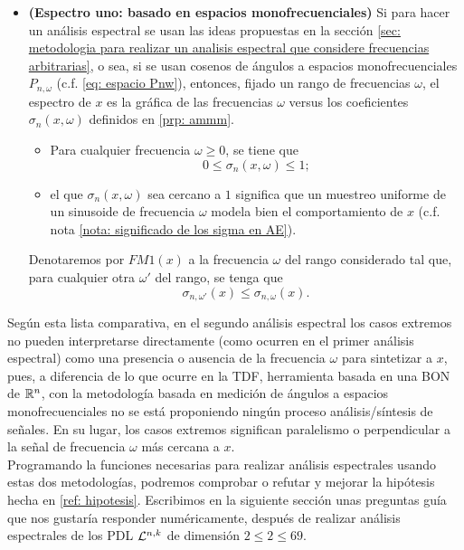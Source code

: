 \begin{itemize}
	\item \textbf{(Espectro uno: basado en espacios monofrecuenciales)} 
	Si para hacer un análisis espectral se usan
	las ideas propuestas en 
	la sección
	\ref{sec: metodologia para realizar un analisis espectral que considere frecuencias arbitrarias}, 
	o sea, si se usan cosenos de ángulos a
	espacios monofrecuenciales $P_{n, \omega}$
	(c.f. \ref{eq: espacio Pnw}),	
	entonces, fijado un rango de frecuencias 
	$\omega$,
	el espectro de $x$ es la gráfica de 
	las frecuencias $\omega$ versus	
	los coeficientes
	$\sigma_{n}(x, \omega)$ definidos en 
	\eqref{prp: ammm}.\\
	\begin{itemize}
		\item Para cualquier frecuencia $\omega \geq 0$, se tiene que
		\[
		0 \leq \sigma_{n}(x, \omega) \leq 1;
		\]
		\item 
	el que
	$\sigma_{n}(x, \omega)$ sea cercano a $1$ significa que un
	muestreo uniforme de un sinusoide de frecuencia $\omega$
	modela bien el comportamiento de $x$ (c.f. 
	nota \ref{nota: significado de los sigma en AE}).
	\end{itemize}
	\begin{defi}
	\label{def: FM1}
	Denotaremos
	por $FM1(x)$ a la frecuencia $\omega$ del rango considerado
	tal que, para cualquier otra $\omega'$ del rango, se tenga que
	\[
	\sigma_{n, \omega'}(x) \leq \sigma_{n, \omega}(x).
	\]
	\end{defi}
\end{itemize}

Según esta lista comparativa, en el segundo análisis espectral 
los casos extremos no pueden interpretarse directamente (como ocurren en el primer
análisis espectral) como una presencia o ausencia de 
la frecuencia $\omega$ para sintetizar a $x$, pues, a diferencia de lo
que ocurre en la TDF, herramienta basada en una BON
de $\mathbb{R}^{n}$, con la metodología basada en medición de ángulos
a espacios monofrecuenciales no se está proponiendo ningún proceso
análisis/síntesis de señales. En su lugar, los casos extremos significan paralelismo
o perpendicular a la señal de frecuencia $\omega$ más cercana a $x$. \\


Programando la funciones necesarias para realizar análisis espectrales
usando estas dos metodologías, podremos comprobar o refutar y mejorar
la hipótesis hecha en 
\ref{ref: hipotesis}. 
Escribimos en la siguiente sección unas preguntas guía
que nos gustaría responder numéricamente, después de 
realizar análisis espectrales de los PDL
$\mathcal{L}^{n,k}$ de dimensión $2 \leq 2 \leq 69$. \\

